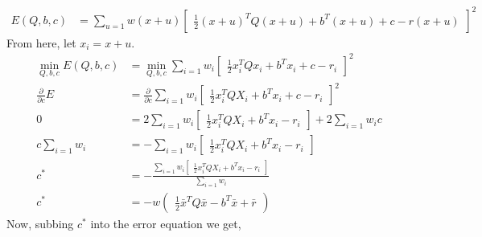 \begin{align*}
E(Q,b,c) &= \sum_{u=1}w(x+u) \begin{bmatrix} \frac{1}{2}(x+u)^TQ(x+u) + b^T(x+u) + c - r(x+u) \end{bmatrix}^2
\end{align*}
From here, let $x_i = x+u$.
\begin{align*}
\underset{Q,b,c}{\operatorname{min}} E(Q,b,c) &=
\underset{Q,b,c}{\operatorname{min}} \sum_{i=1}w_i \begin{bmatrix} \frac{1}{2}x_i^TQx_i + b^Tx_i + c - r_i \end{bmatrix}^2 \\
\frac{\partial}{\partial c} E &= \frac{\partial}{\partial c} \sum_{i=1} w_i \begin{bmatrix} \frac{1}{2} x_i^TQX_i + b^Tx_i + c - r_i \end{bmatrix}^2 \\
0 &= 2  \sum_{i=1} w_i \begin{bmatrix} \frac{1}{2} x_i^TQX_i + b^Tx_i - r_i \end{bmatrix} + 2 \sum_{i=1} w_ic \\
c \sum_{i=1}w_i &= -\sum_{i=1} w_i \begin{bmatrix} \frac{1}{2} x_i^TQX_i + b^Tx_i - r_i \end{bmatrix} \\
c^* & = -\frac{\sum_{i=1} w_i \begin{bmatrix} \frac{1}{2} x_i^TQX_i + b^Tx_i - r_i \end{bmatrix}}{\sum_{i=1}w_i} \\
c^* & = -w \begin{pmatrix} \frac{1}{2} \bar{x}^TQ\bar{x} - b^T\bar{x} + \bar{r} \end{pmatrix}
\end{align*}
Now, subbing $c^*$ into the error equation we get,
